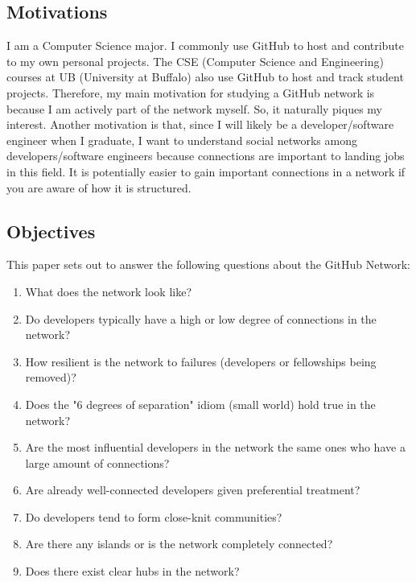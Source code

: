 \documentclass[9pt,twocolumn,twoside]{pnas-new}
\begin{document}
\subsection{Motivations} I am a Computer Science major. I commonly use GitHub to host and contribute to my own personal projects. The CSE (Computer Science and Engineering) courses at UB (University at Buffalo) also use GitHub to host and track student projects. Therefore, my main motivation for studying a GitHub network is because I am actively part of the network myself.  So, it naturally piques my interest. Another motivation is that, since I will likely be a developer/software engineer when I graduate, I want to understand social networks among developers/software engineers because connections are important to landing jobs in this field. It is potentially easier to gain important connections in a network if you are aware of how it is structured.

\subsection{Objectives} This paper sets out to answer the following questions about the GitHub Network:

\begin{enumerate}
  \item What does the network look like?
  \item Do developers typically have a high or low degree of connections in the network?
  \item How resilient is the network to failures (developers or fellowships being removed)?
  \item Does the "6 degrees of separation" idiom (small world) hold true in the network?
  \item Are the most influential developers in the network the same ones who have a large amount of connections?
  \item Are already well-connected developers given preferential treatment?
  \item Do developers tend to form close-knit communities?
  \item Are there any islands or is the network completely connected?
  \item Does there exist clear hubs in the network?
\end{enumerate}
\end{document}
